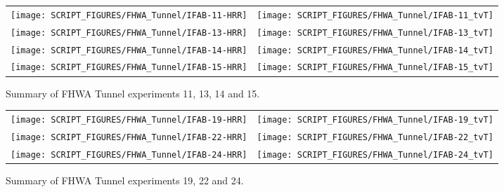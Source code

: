 \begin{figure}[p]
\begin{tabular*}{\textwidth}{l@{\extracolsep{\fill}}r}
\texttt{[image: SCRIPT\_FIGURES/FHWA\_Tunnel/IFAB-11-HRR]} &
\texttt{[image: SCRIPT\_FIGURES/FHWA\_Tunnel/IFAB-11\_tvT]} \\
\texttt{[image: SCRIPT\_FIGURES/FHWA\_Tunnel/IFAB-13-HRR]} &
\texttt{[image: SCRIPT\_FIGURES/FHWA\_Tunnel/IFAB-13\_tvT]} \\
\texttt{[image: SCRIPT\_FIGURES/FHWA\_Tunnel/IFAB-14-HRR]} &
\texttt{[image: SCRIPT\_FIGURES/FHWA\_Tunnel/IFAB-14\_tvT]} \\
\texttt{[image: SCRIPT\_FIGURES/FHWA\_Tunnel/IFAB-15-HRR]} &
\texttt{[image: SCRIPT\_FIGURES/FHWA\_Tunnel/IFAB-15\_tvT]}
\end{tabular*}
\caption[Summary of FHWA Tunnel experiments 11, 13, 14 and 15]{Summary of FHWA Tunnel experiments 11, 13, 14 and 15.}
\label{FHWA_Tunnel_Results_2}
\end{figure}

\begin{figure}[p]
\begin{tabular*}{\textwidth}{l@{\extracolsep{\fill}}r}
\texttt{[image: SCRIPT\_FIGURES/FHWA\_Tunnel/IFAB-19-HRR]} &
\texttt{[image: SCRIPT\_FIGURES/FHWA\_Tunnel/IFAB-19\_tvT]} \\
\texttt{[image: SCRIPT\_FIGURES/FHWA\_Tunnel/IFAB-22-HRR]} &
\texttt{[image: SCRIPT\_FIGURES/FHWA\_Tunnel/IFAB-22\_tvT]} \\
\texttt{[image: SCRIPT\_FIGURES/FHWA\_Tunnel/IFAB-24-HRR]} &
\texttt{[image: SCRIPT\_FIGURES/FHWA\_Tunnel/IFAB-24\_tvT]}
\end{tabular*}
\caption[Summary of FHWA Tunnel experiments 19, 22 and 24]{Summary of FHWA Tunnel experiments 19, 22 and 24.}
\label{FHWA_Tunnel_Results_3}
\end{figure}



